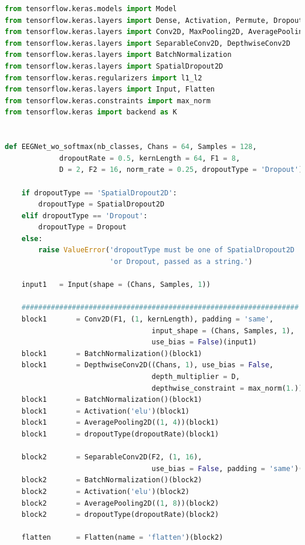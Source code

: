 \documentclass[conference]{IEEEtran}
\begin{document}
    \begin{lstlisting}[language=Python, caption=Machine Learning Model, label=ml_model]
from tensorflow.keras.models import Model
from tensorflow.keras.layers import Dense, Activation, Permute, Dropout
from tensorflow.keras.layers import Conv2D, MaxPooling2D, AveragePooling2D
from tensorflow.keras.layers import SeparableConv2D, DepthwiseConv2D
from tensorflow.keras.layers import BatchNormalization
from tensorflow.keras.layers import SpatialDropout2D
from tensorflow.keras.regularizers import l1_l2
from tensorflow.keras.layers import Input, Flatten
from tensorflow.keras.constraints import max_norm
from tensorflow.keras import backend as K


def EEGNet_wo_softmax(nb_classes, Chans = 64, Samples = 128, 
             dropoutRate = 0.5, kernLength = 64, F1 = 8, 
             D = 2, F2 = 16, norm_rate = 0.25, dropoutType = 'Dropout'):
    
    if dropoutType == 'SpatialDropout2D':
        dropoutType = SpatialDropout2D
    elif dropoutType == 'Dropout':
        dropoutType = Dropout
    else:
        raise ValueError('dropoutType must be one of SpatialDropout2D '
                         'or Dropout, passed as a string.')
    
    input1   = Input(shape = (Chans, Samples, 1))

    ##################################################################
    block1       = Conv2D(F1, (1, kernLength), padding = 'same',
                                   input_shape = (Chans, Samples, 1),
                                   use_bias = False)(input1)
    block1       = BatchNormalization()(block1)
    block1       = DepthwiseConv2D((Chans, 1), use_bias = False, 
                                   depth_multiplier = D,
                                   depthwise_constraint = max_norm(1.))(block1)
    block1       = BatchNormalization()(block1)
    block1       = Activation('elu')(block1)
    block1       = AveragePooling2D((1, 4))(block1)
    block1       = dropoutType(dropoutRate)(block1)
    
    block2       = SeparableConv2D(F2, (1, 16),
                                   use_bias = False, padding = 'same')(block1)
    block2       = BatchNormalization()(block2)
    block2       = Activation('elu')(block2)
    block2       = AveragePooling2D((1, 8))(block2)
    block2       = dropoutType(dropoutRate)(block2)
        
    flatten      = Flatten(name = 'flatten')(block2)
    

\end{lstlisting}
\end{document}
